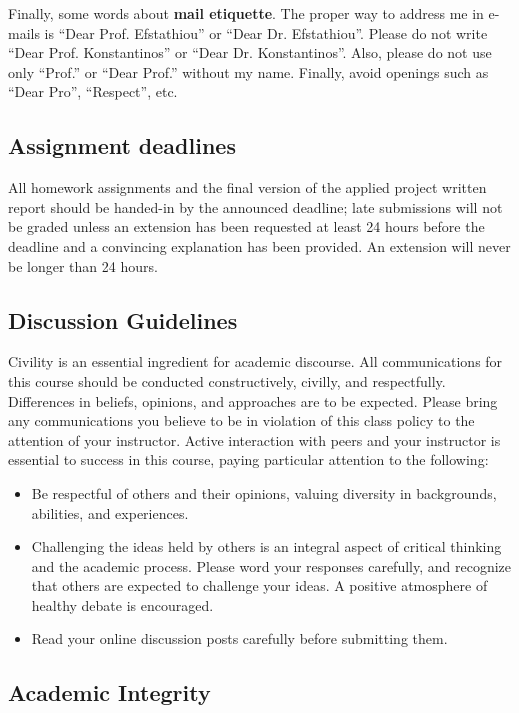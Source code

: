 \documentclass[11pt]{article}
\begin{document}
Finally, some words about \textbf{mail etiquette}. The proper way to address me in e-mails is ``Dear Prof. Efstathiou'' or ``Dear Dr. Efstathiou''. Please do not write ``Dear Prof. Konstantinos'' or ``Dear Dr. Konstantinos''. Also, please do not use only ``Prof.'' or ``Dear Prof.'' without my name.  Finally, avoid openings such as ``Dear Pro'', ``Respect'', etc.


\subsection{Assignment deadlines}

All homework assignments and the final version of the applied project written report should be handed-in by the announced deadline; late submissions will not be graded unless an extension has been requested at least 24 hours before the deadline and a convincing explanation has been provided. An extension will never be longer than 24 hours. 

\subsection{Discussion Guidelines}

Civility is an essential ingredient for academic discourse. All communications for this course should be conducted constructively, civilly, and respectfully. Differences in beliefs, opinions, and approaches are to be expected. Please bring any communications you believe to be in violation of this class policy to the attention of your instructor. Active interaction with peers and your instructor is essential to success in this course, paying particular attention to the following: 
\begin{itemize}[label={-},noitemsep]
\item Be respectful of others and their opinions, valuing diversity in backgrounds, abilities, and experiences.  
\item Challenging the ideas held by others is an integral aspect of critical thinking and the academic process. Please word your responses carefully, and recognize that others are expected to challenge your ideas. A positive atmosphere of healthy debate is encouraged.  
\item Read your online discussion posts carefully before submitting them. 
\end{itemize}

\subsection{Academic Integrity}
\end{document}
